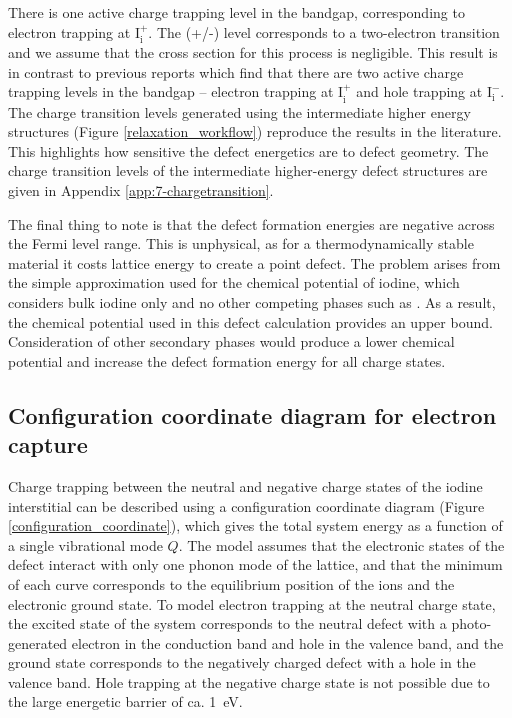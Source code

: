 There is one active charge trapping level in the bandgap, corresponding to electron trapping at $\mathrm{I}_\mathrm{i}^+$.  The (+/-) level corresponds to a two-electron transition and we assume that the cross section for this process is negligible. This result is in contrast to previous reports which find that there are two active charge trapping levels in the bandgap -- electron trapping at $\mathrm{I}_\mathrm{i}^+$ and hole trapping at $\mathrm{I}_\mathrm{i}^-$.
The charge transition levels generated using the intermediate higher energy structures (Figure \ref{relaxation_workflow}) reproduce the results in the literature. This highlights how sensitive the defect energetics are to defect geometry. The charge transition levels of the intermediate higher-energy defect structures are given in Appendix \ref{app:7-chargetransition}.

The final thing to note is that the defect formation energies are negative across the Fermi level range. This is unphysical, as for a thermodynamically stable material it costs lattice energy to create a point defect. The problem arises from the simple approximation used for the chemical potential of iodine, which considers bulk iodine only and no other competing phases such as . As a result, the chemical potential used in this defect calculation provides an upper bound. Consideration of other secondary phases would produce a lower chemical potential and increase the defect formation energy for all charge states. 

\subsection{Configuration coordinate diagram for electron capture} \label{ch6:ccd}

Charge trapping between the neutral and negative charge states of the iodine interstitial can be described using a configuration coordinate diagram (Figure \ref{configuration_coordinate}), which gives the total system energy as a function of a single vibrational mode $Q$.\autocite{Alkauskas2016} 
The model assumes that the electronic states of the defect interact with only one phonon mode of the lattice, and that
the minimum of each curve corresponds to the equilibrium position of the ions and the electronic ground state. 
To model electron trapping at the neutral charge state, the excited state of the system corresponds to the neutral defect with a photo-generated electron in the conduction band and hole in the valence band, and the ground state corresponds to the negatively charged defect with a hole in the valence band.
Hole trapping at the negative charge state is not possible due to the large energetic barrier of ca. \SI{1}{\electronvolt}.


